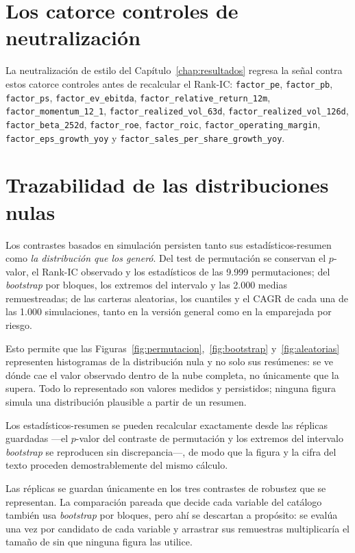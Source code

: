 \section{Los catorce controles de neutralización}

La neutralización de estilo del Capítulo~\ref{chap:resultados} regresa la señal contra estos
catorce controles antes de recalcular el Rank-IC: \texttt{factor\_pe}, \texttt{factor\_pb},
\texttt{factor\_ps}, \texttt{factor\_ev\_ebitda}, \texttt{factor\_relative\_return\_12m},
\texttt{factor\_momentum\_12\_1}, \texttt{factor\_realized\_vol\_63d},
\texttt{factor\_realized\_vol\_126d}, \texttt{factor\_beta\_252d}, \texttt{factor\_roe},
\texttt{factor\_roic}, \texttt{factor\_operating\_margin}, \texttt{factor\_eps\_growth\_yoy} y
\texttt{factor\_sales\_per\_share\_growth\_yoy}.

\section{Trazabilidad de las distribuciones nulas}

Los contrastes basados en simulación persisten tanto sus estadísticos-resumen como \emph{la
distribución que los generó}. Del test de permutación se conservan el $p$-valor, el Rank-IC
observado y los estadísticos de las 9.999 permutaciones; del \textit{bootstrap} por bloques, los
extremos del intervalo y las 2.000 medias remuestreadas; de las carteras aleatorias, los cuantiles
y el CAGR de cada una de las 1.000 simulaciones, tanto en la versión general como en la emparejada
por riesgo.

Esto permite que las Figuras~\ref{fig:permutacion},~\ref{fig:bootstrap} y~\ref{fig:aleatorias}
representen histogramas de la distribución nula y no solo sus resúmenes: se ve dónde cae el valor
observado dentro de la nube completa, no únicamente que la supera. Todo lo representado son valores
medidos y persistidos; ninguna figura simula una distribución plausible a partir de un resumen.

Los estadísticos-resumen se pueden recalcular exactamente desde las réplicas guardadas —el
$p$-valor del contraste de permutación y los extremos del intervalo \textit{bootstrap} se
reproducen sin discrepancia—, de modo que la figura y la cifra del texto proceden demostrablemente
del mismo cálculo.

Las réplicas se guardan únicamente en los tres contrastes de robustez que se representan. La
comparación pareada que decide cada variable del catálogo también usa \textit{bootstrap} por
bloques, pero ahí se descartan a propósito: se evalúa una vez por candidato de cada variable y
arrastrar sus remuestras multiplicaría el tamaño de  sin que ninguna
figura las utilice.

